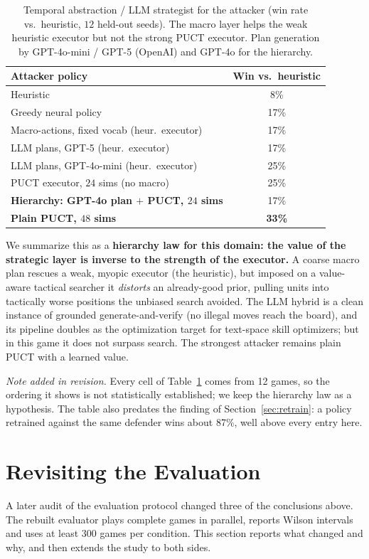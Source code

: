 \documentclass{article}
\begin{document}
\begin{table}[t]
\centering
\caption{Temporal abstraction / LLM strategist for the attacker (win rate vs.\ heuristic,
$12$ held-out seeds). The macro layer helps the weak heuristic executor but not the strong
PUCT executor. Plan generation by GPT-4o-mini / GPT-5 (OpenAI) and GPT-4o for the hierarchy.}
\label{tab:hier}
\begin{tabular}{lc}
\toprule
\textbf{Attacker policy} & \textbf{Win vs.\ heuristic} \\
\midrule
Heuristic                                   & 8\% \\
Greedy neural policy                         & 17\% \\
Macro-actions, fixed vocab (heur.\ executor) & 17\% \\
LLM plans, GPT-5 (heur.\ executor)           & 17\% \\
LLM plans, GPT-4o-mini (heur.\ executor)     & 25\% \\
PUCT executor, $24$ sims (no macro)          & 25\% \\
\textbf{Hierarchy: GPT-4o plan $+$ PUCT, $24$ sims} & 17\% \\
\textbf{Plain PUCT, $48$ sims}              & \textbf{33\%} \\
\bottomrule
\end{tabular}
\end{table}

We summarize this as a \textbf{hierarchy law for this domain: the value of the strategic
layer is inverse to the strength of the executor.} A coarse macro plan rescues a weak,
myopic executor (the heuristic), but imposed on a value-aware tactical searcher it
\emph{distorts} an already-good prior, pulling units into tactically worse positions the
unbiased search avoided. The LLM hybrid is a clean instance of grounded
generate-and-verify (no illegal moves reach the board), and its pipeline doubles as the
optimization target for text-space skill optimizers; but in this game it does not surpass
search. The strongest attacker remains plain PUCT with a learned value.

\emph{Note added in revision.} Every cell of Table~\ref{tab:hier} comes from 12 games, so
the ordering it shows is not statistically established; we keep the hierarchy law as a
hypothesis. The table also predates the finding of Section~\ref{sec:retrain}: a policy
retrained against the same defender wins about 87\%, well above every entry here.

\section{Revisiting the Evaluation}
\label{sec:revisit}
A later audit of the evaluation protocol changed three of the conclusions above. The
rebuilt evaluator plays complete games in parallel, reports Wilson intervals and uses at
least 300 games per condition. This section reports what changed and why, and
then extends the study to both sides.
\end{document}
